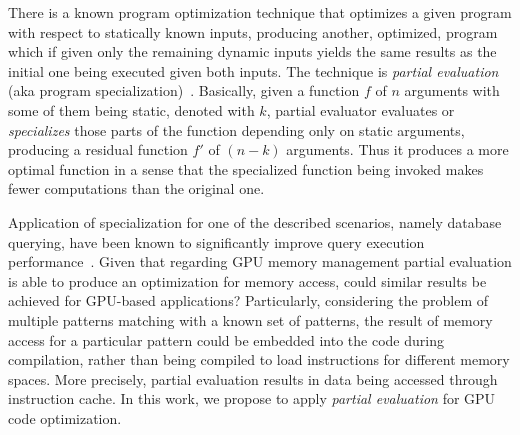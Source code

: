 \documentclass[sigplan,review,anonymous]{acmart}\settopmatter{printfolios=true,printccs=false,printacmref=false}
\begin{document}
There is a known program optimization technique that optimizes a given program with respect to statically known inputs, producing another, optimized, program which if given only the remaining dynamic inputs yields the same results as the initial one being executed given both inputs.
The technique is \textit{partial evaluation} (aka program specialization)~\cite{Jones:1993:PEA:153676,PartialEvalPaper}.
Basically, given a function $f$ of $n$ arguments with some of them being static, denoted with $k$, partial evaluator evaluates or \textit{specializes} those parts of the function depending only on static arguments, producing a residual function $f'$ of $(n-k)$ arguments.
Thus it produces a more optimal function in a sense that the specialized function being invoked makes fewer computations than the original one.

Application of specialization for one of the described scenarios, namely database querying, have been known to significantly improve query execution performance~\cite{10.1007/978-3-319-74313-4_27}.
Given that regarding GPU memory management partial evaluation is able to produce an optimization for memory access, could similar results be achieved for GPU-based applications? 
Particularly, considering the problem of multiple patterns matching with a known set of patterns, the result of memory access for a particular pattern could be embedded into the code during compilation, rather than being compiled to load instructions for different memory spaces. 
More precisely, partial evaluation results in data being accessed through instruction cache. 
In this work, we propose to apply \emph{partial evaluation} for GPU code optimization.

\end{document}
